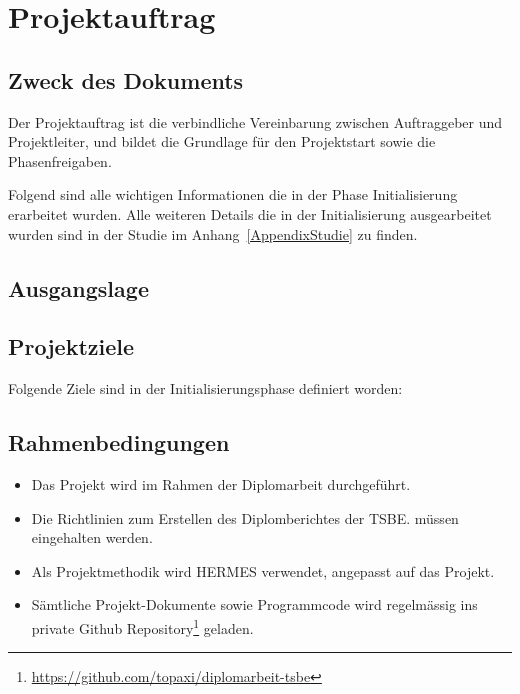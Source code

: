 \chapter{Projektauftrag}

\label{AppendixProjektauftrag}

\section{Zweck des Dokuments}\label{ProjektauftragZweck}

Der Projektauftrag ist die verbindliche Vereinbarung zwischen Auftraggeber und
Projektleiter, und bildet die Grundlage für den Projektstart sowie die
Phasenfreigaben.

Folgend sind alle wichtigen Informationen die in der Phase Initialisierung
erarbeitet wurden. Alle weiteren Details die in der Initialisierung
ausgearbeitet wurden sind in der Studie im Anhang~\ref{AppendixStudie} zu
finden.

\section{Ausgangslage}\label{ausgangslage}



\clearpage
\section{Projektziele}\label{projektziele}

Folgende Ziele sind in der Initialisierungsphase definiert worden:



\section{Rahmenbedingungen}\label{rahmenbedingungen}

\begin{itemize}
  \tightlist
  \item{}
        Das Projekt wird im Rahmen der Diplomarbeit durchgeführt.
  \item{}
        Die Richtlinien zum Erstellen des Diplomberichtes der TSBE.
        müssen eingehalten werden.
  \item{}
        Als Projektmethodik wird HERMES verwendet, angepasst auf das Projekt.
  \item{}
        Sämtliche Projekt-Dokumente sowie Programmcode wird regelmässig ins private Github
        Repository\footnote{\url{https://github.com/topaxi/diplomarbeit-tsbe}} geladen.
\end{itemize}

